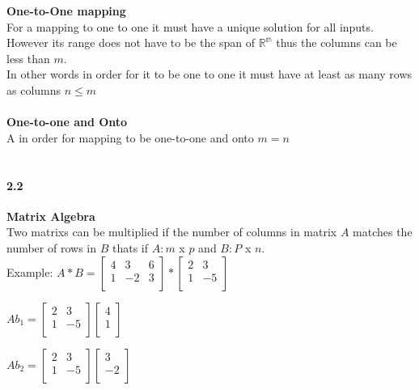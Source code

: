 \documentclass[14pt]{extreport}
\begin{document}
\textbf{One-to-One mapping}\\

For a mapping to one to one it must have a unique solution for all inputs. However its range does not have to be the span of $\mathbb{R^m}$ thus the columns can be less than $m$.\\

In other words in order for it to be one to one it must have at least as many rows as columns $n \le m$\\\\

\textbf{One-to-one and Onto}\\

A in order for mapping to be one-to-one and onto $m=n$\\\\


\paragraph{2.2}\textbf{Matrix Algebra}\\

Two matrixs can be multiplied if the number of columns in matrix $A$ matches the number of rows in $B$ thats if $A: m$ x $p$ and $B: P$ x $n$.\\

Example: $A*B = \begin{bmatrix}
	4 & 3 & 6\\
	1 & -2 & 3\\
	\end{bmatrix} *
	\begin{bmatrix}
	2 & 3\\
	1 & -5\\
	\end{bmatrix}$ 

$Ab_1 = \begin{bmatrix}
	2 & 3\\
	1 & -5\\
	\end{bmatrix}
	\begin{bmatrix}
	4\\
	1\\
	\end{bmatrix}
$

$Ab_2 = \begin{bmatrix}
	2 & 3\\
	1 & -5\\
	\end{bmatrix}
	\begin{bmatrix}
	3\\
	-2\\
	\end{bmatrix}
$
\end{document}
